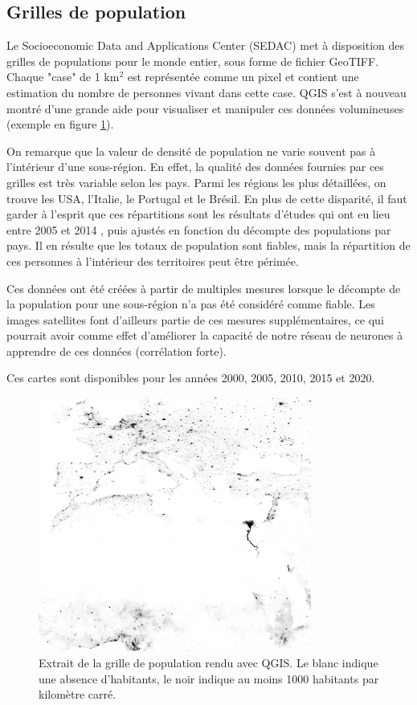 \documentclass[a4paper, 11pt]{report}
\begin{document}
\subsection{Grilles de population}
Le Socioeconomic Data and Applications Center (SEDAC) \cite{sedac} met à disposition des grilles de populations pour le monde entier, sous forme de fichier GeoTIFF. Chaque "case" de 1 km$^2$ est représentée comme un pixel et contient une estimation du nombre de personnes vivant dans cette case. QGIS s'est à nouveau montré d'une grande aide pour visualiser et manipuler ces données volumineuses (exemple en figure \ref{qgis-sedac}).

On remarque que la valeur de densité de population ne varie souvent pas à l'intérieur d'une sous-région. En effet, la qualité des données fournies par ces grilles est très variable selon les pays. Parmi les régions les plus détaillées, on trouve les USA, l'Italie, le Portugal et le Brésil. En plus de cette disparité, il faut garder à l'esprit que ces répartitions sont les résultats d'études qui ont eu lieu entre 2005 et 2014 \cite{sedac}, puis ajustés en fonction du décompte des populations par pays. Il en résulte que les totaux de population sont fiables, mais la répartition de ces personnes à l'intérieur des territoires peut être périmée.

Ces données ont été créées à partir de multiples mesures lorsque le décompte de la population pour une sous-région n'a pas été considéré comme fiable. Les images satellites font d'ailleurs partie de ces mesures supplémentaires, ce qui pourrait avoir comme effet d'améliorer la capacité de notre réseau de neurones à apprendre de ces données (corrélation forte).

Ces cartes sont disponibles pour les années 2000, 2005, 2010, 2015 et 2020.

\begin{figure}[h]
	\centering
	\includegraphics[width=0.8\textwidth]{img/pop_subset.png}
	\caption{Extrait de la grille de population \cite{sedac} rendu avec QGIS. Le blanc indique une absence d'habitants, le noir indique au moins 1000 habitants par kilomètre carré.}
	\label{qgis-sedac}
\end{figure}
\end{document}

